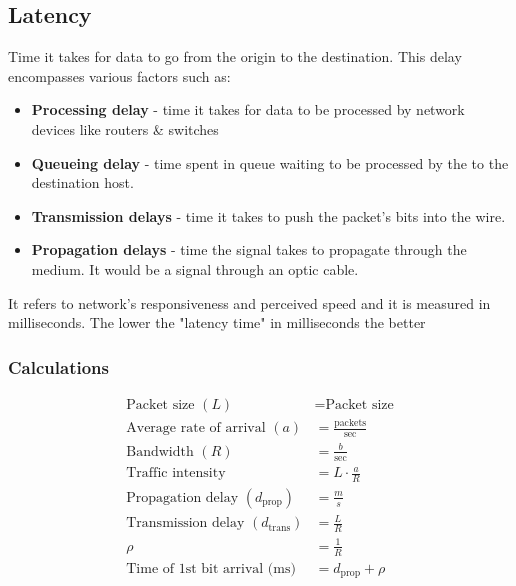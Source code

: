 \documentclass[11pt,a4paper]{article}
\begin{document}
	\subsection{Latency}
	Time it takes for data to go from the origin to the destination. This delay encompasses various factors such as:
	\begin{itemize}
		\item \textbf{Processing delay} - time it takes for data to be processed by network devices like routers \& switches
		\item \textbf{Queueing delay} - time spent in queue waiting to be processed by the to the destination host.
		\item \textbf{Transmission delays} - time it takes to push the packet’s bits into the wire.
		\item \textbf{Propagation delays} - time the signal takes to propagate through the medium. It would be a signal through an optic cable.
	\end{itemize}
	It refers to network’s responsiveness and perceived speed and it is measured in milliseconds. The lower the "latency time" in milliseconds the better

	\subsubsection{Calculations}
	
	\begin{flushleft}	
		\[
		\begin{aligned}
			\text{Packet size } (L) &= \text{Packet size} \\
			\text{Average rate of arrival } (a) &= \frac{\text{packets}}{\text{sec}} \\
			\text{Bandwidth } (R) &= \frac{b}{\text{sec}} \\
			\text{Traffic intensity} &= L \cdot \frac{a}{R} \\
			\text{Propagation delay } (d_{\text{prop}}) &= \frac{m}{s} \\
			\text{Transmission delay } (d_{\text{trans}}) &= \frac{L}{R} \\
			\rho &= \frac{1}{R} \\
			\text{Time of 1st bit arrival (ms)} &= d_{\text{prop}} + \rho
		\end{aligned}
		\]
	\end{flushleft}

	
	\label{sec:background}
\end{document}
